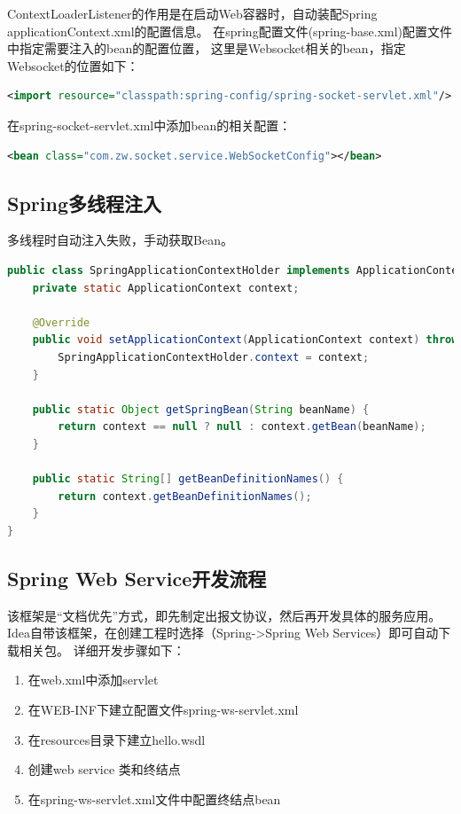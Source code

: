\documentclass{book}
\begin{document}
ContextLoaderListener的作用是在启动Web容器时，自动装配Spring applicationContext.xml的配置信息。
在spring配置文件(spring-base.xml)配置文件中指定需要注入的bean的配置位置，
这里是Websocket相关的bean，指定Websocket的位置如下：

\begin{lstlisting}[language=XML]
<import resource="classpath:spring-config/spring-socket-servlet.xml"/>
\end{lstlisting}

在spring-socket-servlet.xml中添加bean的相关配置：

\begin{lstlisting}[language=XML]
<bean class="com.zw.socket.service.WebSocketConfig"></bean>
\end{lstlisting}

\subsection{Spring多线程注入}

多线程时自动注入失败，手动获取Bean。

\begin{lstlisting}[language=Java]
public class SpringApplicationContextHolder implements ApplicationContextAware {
	private static ApplicationContext context;
	
	@Override
	public void setApplicationContext(ApplicationContext context) throws BeansException {
		SpringApplicationContextHolder.context = context;
	}
	
	public static Object getSpringBean(String beanName) {
		return context == null ? null : context.getBean(beanName);
	}
	
	public static String[] getBeanDefinitionNames() {
		return context.getBeanDefinitionNames();
	}
}
\end{lstlisting}

\subsection{Spring Web Service开发流程}

该框架是“文档优先”方式，即先制定出报文协议，然后再开发具体的服务应用。
Idea自带该框架，在创建工程时选择（Spring->Spring Web Services）即可自动下载相关包。
详细开发步骤如下：

\begin{enumerate}
	\setcounter{enumi}{0}
	\item{在web.xml中添加servlet}
	\item{在WEB-INF下建立配置文件spring-ws-servlet.xml}
	\item{在resources目录下建立hello.wsdl}
	\item{创建web service 类和终结点}
	\item{在spring-ws-servlet.xml文件中配置终结点bean}
\end{enumerate}
\end{document}
